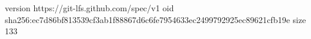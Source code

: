 version https://git-lfs.github.com/spec/v1
oid sha256:ec7d86bf813539cf3ab1f88867d6c6fe7954633ec2499792925ec89621cfb19e
size 133
